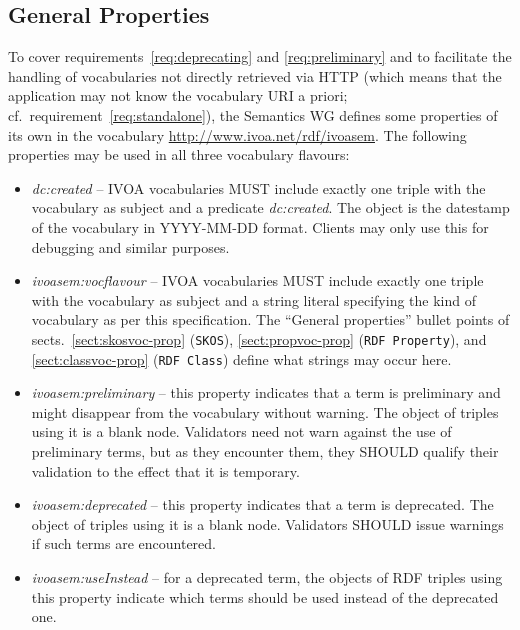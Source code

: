 \documentclass[11pt,a4paper]{ivoa}
\newcommand{\vocterm}[1]{\emph{\color{termcolor}#1}}
\begin{document}
\subsection{General Properties}
\label{sect:genprop}

To cover requirements~\ref{req:deprecating} and
\ref{req:preliminary} and to facilitate the handling of vocabularies not
directly retrieved via HTTP (which means that the application may not
know the vocabulary URI a priori; cf.~requirement~\ref{req:standalone}), 
the Semantics WG defines some
properties of its own in the vocabulary
\url{http://www.ivoa.net/rdf/ivoasem}.  The following properties may be
used in all three vocabulary flavours:

\begin{itemize}
\item \vocterm{dc:created} -- IVOA vocabularies MUST include exactly one
triple with the vocabulary as subject and a predicate
\vocterm{dc:created}.  The object is the datestamp of the vocabulary in
YYYY-MM-DD format.  Clients may only use this for debugging and similar
purposes.

\item \vocterm{ivoasem:vocflavour} -- IVOA vocabularies MUST include
exactly one triple with the vocabulary as subject and a string literal
specifying the kind of vocabulary as per this specification.  The
``General properties'' bullet points of sects.~\ref{sect:skosvoc-prop}
(\verb|SKOS|), \ref{sect:propvoc-prop} (\verb|RDF Property|), and
\ref{sect:classvoc-prop} (\verb|RDF Class|) define what strings may occur
here.

\item \vocterm{ivoasem:preliminary} -- this property indicates
that a term is preliminary and might disappear from the
vocabulary without warning.  The object of triples using it
is a blank node.  Validators need not warn against the use
of preliminary terms, but as they encounter them, they SHOULD
qualify their validation to the effect that it is temporary.

\item \vocterm{ivoasem:deprecated} -- this property indicates
that a term is deprecated.  The object of triples using it 
is a blank node.  Validators SHOULD issue warnings if such terms
are encountered.

\item \vocterm{ivoasem:useInstead} -- for a deprecated term, the
objects of RDF triples using this property indicate
which terms should be
used instead of the deprecated one.

\end{itemize}
\end{document}
